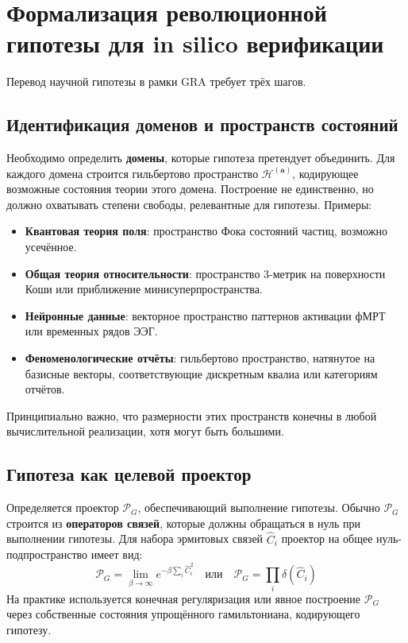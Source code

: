 \documentclass[11pt,a4paper]{article}
\begin{document}
\section{Формализация революционной гипотезы для in silico верификации}

Перевод научной гипотезы в рамки GRA требует трёх шагов.

\subsection{Идентификация доменов и пространств состояний}

Необходимо определить \textbf{домены}, которые гипотеза претендует объединить. Для каждого домена строится гильбертово пространство \(\mathcal{H}^{(\mathbf{a})}\), кодирующее возможные состояния теории этого домена. Построение не единственно, но должно охватывать степени свободы, релевантные для гипотезы. Примеры:
\begin{itemize}
    \item \textbf{Квантовая теория поля}: пространство Фока состояний частиц, возможно усечённое.
    \item \textbf{Общая теория относительности}: пространство 3-метрик на поверхности Коши или приближение минисуперпространства.
    \item \textbf{Нейронные данные}: векторное пространство паттернов активации фМРТ или временных рядов ЭЭГ.
    \item \textbf{Феноменологические отчёты}: гильбертово пространство, натянутое на базисные векторы, соответствующие дискретным квалиа или категориям отчётов.
\end{itemize}
Принципиально важно, что размерности этих пространств конечны в любой вычислительной реализации, хотя могут быть большими.

\subsection{Гипотеза как целевой проектор}

Определяется проектор \(\mathcal{P}_G\), обеспечивающий выполнение гипотезы. Обычно \(\mathcal{P}_G\) строится из \textbf{операторов связей}, которые должны обращаться в нуль при выполнении гипотезы. Для набора эрмитовых связей \(\hat{C}_i\) проектор на общее нуль-подпространство имеет вид:
\begin{equation}
\mathcal{P}_G = \lim_{\beta \to \infty} e^{-\beta \sum_i \hat{C}_i^2} \quad \text{или} \quad \mathcal{P}_G = \prod_i \delta(\hat{C}_i)
\end{equation}
На практике используется конечная регуляризация или явное построение \(\mathcal{P}_G\) через собственные состояния упрощённого гамильтониана, кодирующего гипотезу.
\end{document}
